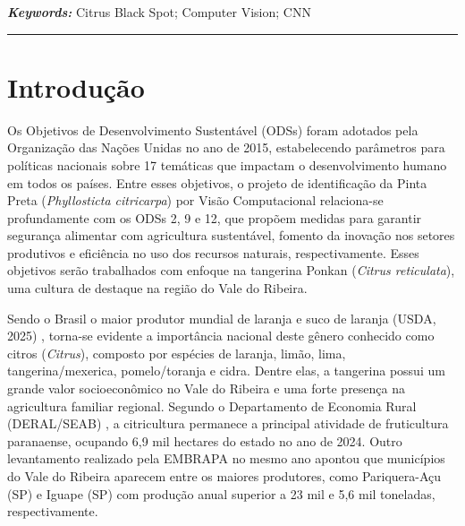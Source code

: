 \documentclass[11pt,a4paper]{article}
\begin{document}
\vspace{0.3cm}
\noindent\textit{\textbf{Keywords:}} Citrus Black Spot; Computer Vision; CNN

\vspace{0.5cm}
\noindent\rule{\textwidth}{0.5pt}
\vspace{0.5cm}

\section{Introdução}



Os Objetivos de Desenvolvimento Sustentável (ODSs) foram adotados pela Organização das Nações Unidas \cite{ONU2025} no ano de 2015, estabelecendo parâmetros para políticas nacionais sobre 17 temáticas que impactam o desenvolvimento humano em todos os países. Entre esses objetivos, o projeto de identificação da Pinta Preta (\emph{Phyllosticta citricarpa}) por Visão Computacional relaciona-se profundamente com os ODSs 2, 9 e 12, que propõem medidas para garantir segurança alimentar com agricultura sustentável, fomento da inovação nos setores produtivos e eficiência no uso dos recursos naturais, respectivamente. Esses objetivos serão trabalhados com enfoque na tangerina Ponkan (\emph{Citrus reticulata}), uma cultura de destaque na região do Vale do Ribeira.

Sendo o Brasil o maior produtor mundial de laranja e suco de laranja (USDA, 2025) \cite{USDA2025}, torna-se evidente a importância nacional deste gênero conhecido como citros (\emph{Citrus}), composto por espécies de laranja, limão, lima, tangerina/mexerica, pomelo/toranja e cidra. Dentre elas, a tangerina possui um grande valor socioeconômico no Vale do Ribeira e uma forte presença na agricultura familiar regional. Segundo o Departamento de Economia Rural (DERAL/SEAB) \cite{DERAL2024}, a citricultura permanece a principal atividade de fruticultura paranaense, ocupando 6,9 mil hectares do estado no ano de 2024. Outro levantamento realizado pela EMBRAPA \cite{Embrapa2024} no mesmo ano apontou que municípios do Vale do Ribeira aparecem entre os maiores produtores, como Pariquera-Açu (SP) e Iguape (SP) com produção anual superior a 23 mil e 5,6 mil toneladas, respectivamente.
\end{document}
